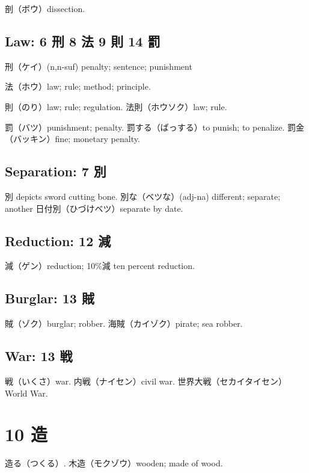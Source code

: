 剖（ボウ）dissection.

\subsection{Law: 6 刑 8 法 9 則 14 罰}

刑（ケイ）(n,n-suf) penalty; sentence; punishment

法（ホウ）law; rule; method; principle.

則（のり）law; rule; regulation.
法則（ホウソク）law; rule.

罰（バツ）punishment; penalty.
罰する（ばっする）to punish; to penalize.
罰金（バッキン）fine; monetary penalty.

\subsection{Separation: 7 別}

別 depicts sword cutting bone.
別な（ベツな）(adj-na) different; separate; another
日付別（ひづけベツ）separate by date.

\subsection{Reduction: 12 減}

減（ゲン）reduction; 10\%減 ten percent reduction.

\subsection{Burglar: 13 賊}

賊（ゾク）burglar; robber.
海賊（カイゾク）pirate; sea robber.

\subsection{War: 13 戦}

戦（いくさ）war.
内戦（ナイセン）civil war.
世界大戦（セカイタイセン）World War.

\section{10 造}

造る（つくる）.
木造（モクゾウ）wooden; made of wood.
